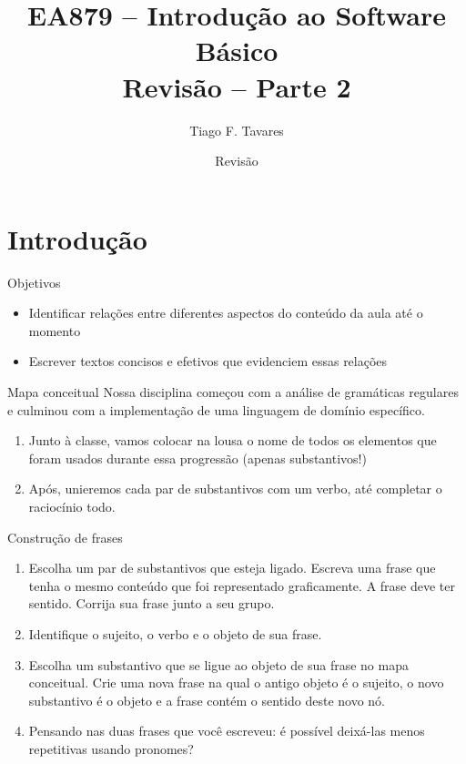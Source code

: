 \documentclass{beamer}
\title[Revisão 2]{EA879 -- Introdução ao Software Básico\\Revisão -- Parte 2}
\author{Tiago F. Tavares}
\institute{FEEC -- UNICAMP}
\date{Revisão}
\begin{document}
\begin{frame}
  \titlepage
\end{frame}


\section{Introdução}

\begin{frame}{Objetivos}
  \Large
  \begin{itemize}
    \item Identificar relações entre diferentes aspectos do conteúdo da aula
      até o momento
    \item Escrever textos concisos e efetivos que evidenciem essas relações
  \end{itemize}
\end{frame}

\begin{frame}[fragile]{Mapa conceitual}
  \centering
  \large
  Nossa disciplina começou com a análise de gramáticas regulares e culminou com
  a implementação de uma linguagem de domínio específico.
  \begin{enumerate}
    \item Junto à classe, vamos colocar na lousa o nome de todos os elementos
      que foram usados durante essa progressão (apenas substantivos!)
    \item <2-> Após, unieremos cada par de substantivos com um verbo, até
      completar o raciocínio todo.
  \end{enumerate}
\end{frame}

\begin{frame}[fragile]{Construção de frases}
  \centering
  \large
  \begin{enumerate}
    \item Escolha um par de substantivos que esteja ligado. Escreva uma frase que
  tenha o mesmo conteúdo que foi representado graficamente. A frase deve ter
      sentido. Corrija sua frase junto a seu grupo.
    \item<2-> Identifique o sujeito, o verbo e o objeto de sua frase.
    \item<3-> Escolha um substantivo que se ligue ao objeto de sua frase no mapa
      conceitual. Crie uma nova frase na qual o antigo objeto é o sujeito, o
      novo substantivo é o objeto e a frase contém o sentido deste novo nó.
    \item<4-> Pensando nas duas frases que você escreveu: é possível deixá-las
      menos repetitivas usando pronomes?
  \end{enumerate}
\end{frame}
\end{document}
